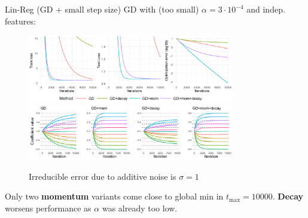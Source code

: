 \documentclass[11pt,compress,t,notes=noshow, xcolor=table]{beamer}
\begin{document}
\begin{vbframe}{Lin-Reg (GD + small step size)}
\vspace{-0.4cm}
GD with (too small) $\alpha=3\cdot10^{-4}$ and indep. features:
\begin{figure}
            \includegraphics[width=0.8\textwidth]{slides/04-multivariate-first-order/figure_man/simu_linmod/GD_reg_small_lr_iters.pdf} \\
             \includegraphics[width=0.8\textwidth]{slides/04-multivariate-first-order/figure_man/simu_linmod/GD_reg_coef_small.pdf}\\
            \begin{footnotesize}
                Irreducible error due to additive noise is $\sigma=1$
            \end{footnotesize}
\end{figure}
Only two \textbf{momentum} variants come close to global min in $t_{\text{max}}=10000$. \textbf{Decay} worsens performance as $\alpha$ was already too low.
\end{vbframe}
\end{document}

